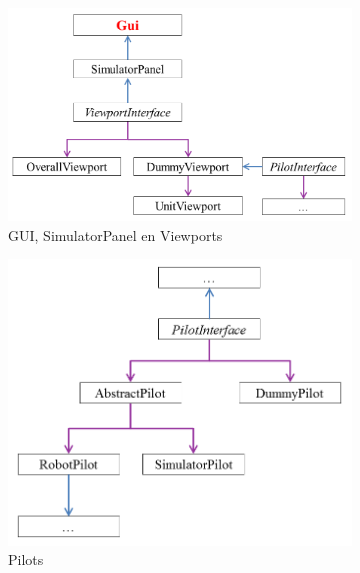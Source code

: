 \documentclass[tt2]{penoverslag}
\begin{document}
\begin{landscape}
\begin{figure}
\centering
	\begin{subfigure}{0.60\textwidth}
	\centering
		\includegraphics[width=\textwidth]{KlasGUI}
		\caption{GUI, SimulatorPanel en Viewports}
	\end{subfigure}%
	\begin{subfigure}{0.5\textwidth}
		\centering
		\includegraphics[width=\textwidth]{KlasPilot}
	\caption{Pilots}
\end{subfigure}%
\begin{subfigure}{0.45\textwidth}
		\centering

\end{subfigure}
\end{figure}
\end{landscape}
\end{document}
